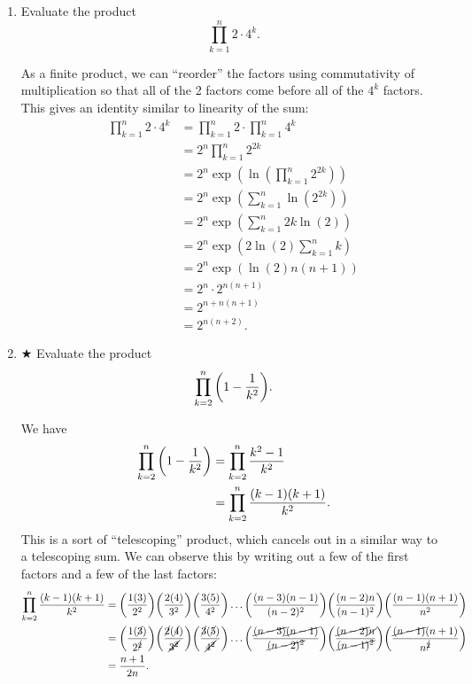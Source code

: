 \documentclass[AppendixA]{subfiles}
\begin{document}
\begin{enumerate}
		\item Evaluate the product
		\[
			\prod_{k = 1}^n 2 \cdot 4^k.
		\]
		\begin{answer}
			As a finite product, we can ``reorder'' the factors using commutativity of multiplication so that all of the 2 factors come before all of the $4^k$ factors. This gives an identity similar to linearity of the sum:
			\begin{align*}
				\prod_{k = 1}^n 2 \cdot 4^k &= \prod_{k = 1}^n 2 \cdot \prod_{k = 1}^n 4^k\\
					&= 2^n \prod_{k = 1}^n 2^{2k}\\
					&= 2^n \exp(\ln(\prod_{k = 1}^n 2^{2k}))\\
					&= 2^n \exp(\sum_{k = 1}^n \ln(2^{2k}))\\
					&= 2^n \exp(\sum_{k = 1}^n 2k\ln(2))\\
					&= 2^n \exp(2\ln(2)\sum_{k = 1}^n k)\\
					&= 2^n \exp(\ln(2)n(n + 1))\\
					&= 2^n \cdot 2^{n(n + 1)}\\
					&= 2^{n + n(n+1)}\\
					&= 2^{n(n+2)}.
			\end{align*}
		\end{answer}
		
		\item $\bigstar$ Evaluate the product
		\[
			\prod_{k = 2}^n \qty(1 - \frac{1}{k^2}).
		\]
		\begin{answer}
			We have
			\begin{align*}
				\prod_{k = 2}^n \qty(1 - \frac{1}{k^2}) &= \prod_{k = 2}^n \frac{k^2 - 1}{k^2}\\
					&= \prod_{k = 2}^n \frac{(k - 1)(k + 1)}{k^2}.
			\end{align*}
			This is a sort of ``telescoping'' product, which cancels out in a similar way to a telescoping sum. We can observe this by writing out a few of the first factors and a few of the last factors:
			\begin{align*}
				\prod_{k = 2}^n \frac{(k - 1)(k + 1)}{k^2} &= \qty(\frac{1(3)}{2^2})\qty(\frac{2(4)}{3^2})\qty(\frac{3(5)}{4^2}) \dots \qty(\frac{(n - 3)(n - 1)}{(n - 2)^2})\qty(\frac{(n - 2)n}{(n - 1)^2})\qty(\frac{(n - 1)(n + 1)}{n^2})\\
					&= \qty(\frac{1(\cancel{3})}{2^{\cancel{2}}})\qty(\frac{\cancel{2}(\cancel{4})}{\cancel{3^2}})\qty(\frac{\cancel{3}(\cancel{5})}{\cancel{4^2}}) \dots \qty(\frac{\cancel{(n - 3)}\cancel{(n - 1)}}{\cancel{(n - 2)^2}})\qty(\frac{\cancel{(n - 2)}\cancel{n}}{\cancel{(n - 1)^2}})\qty(\frac{\cancel{(n - 1)}(n + 1)}{n^{\cancel{2}}})\\
					&= \frac{n+1}{2n}.
			\end{align*}
		\end{answer}
	\end{enumerate}
\end{document}
